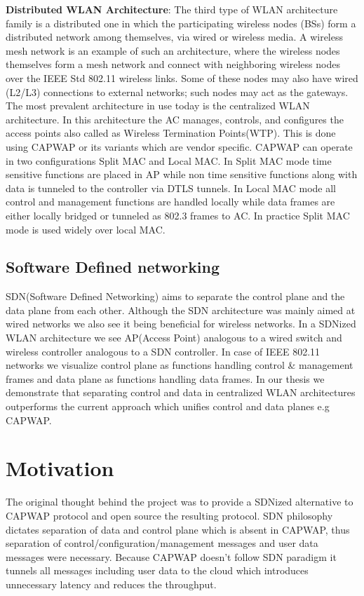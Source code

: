 \documentclass[12pt]{article}
\begin{document}
    \textbf{Distributed WLAN Architecture}: The third type of WLAN architecture family is a distributed one in which the participating wireless nodes (BSs) form a distributed network among themselves, via wired or wireless media. A wireless mesh network is an example of such an architecture, where the wireless nodes themselves form a mesh network and connect with neighboring wireless nodes over the IEEE Std 802.11 wireless links. Some of these nodes may also have wired (L2/L3) connections to external networks; such nodes may act as the gateways. \\
    

    
    The most prevalent architecture in use today is the centralized WLAN architecture. In this architecture the AC manages, controls, and configures the access points also called as Wireless Termination Points(WTP). This is done using CAPWAP\cite{RFC5416} or its variants which are vendor specific. CAPWAP can operate in two configurations Split MAC and Local MAC. In Split MAC mode time sensitive functions are placed in AP while non time sensitive functions along with data is tunneled to the controller via DTLS tunnels. In Local MAC mode all control and management functions are handled locally while data frames are either locally bridged or tunneled as 802.3 frames to AC. In practice Split MAC mode is used widely over local MAC. 


    \subsection{Software Defined networking}
    SDN(Software Defined Networking) aims to separate the control plane and the data plane from each other. Although the SDN architecture was mainly aimed at wired networks we also see it being beneficial for wireless networks. In a SDNized WLAN architecture we see AP(Access Point) analogous to a wired switch and wireless controller analogous to a SDN controller. In case of IEEE 802.11 networks we visualize control plane as functions handling control \& management frames and data plane as functions handling data frames. In our thesis we demonstrate that separating control and data in centralized WLAN architectures outperforms the current approach which unifies control and data planes e.g CAPWAP.
    
    \section{Motivation}
    The original thought behind the project was to provide a SDNized alternative to CAPWAP protocol and open source the resulting protocol. SDN philosophy dictates separation of data and control plane which is absent in CAPWAP, thus separation of control/configuration/management messages and user data messages were necessary. Because CAPWAP doesn't follow SDN paradigm it tunnels all messages including user data to the cloud which introduces unnecessary latency and reduces the throughput.    
    
\end{document}
